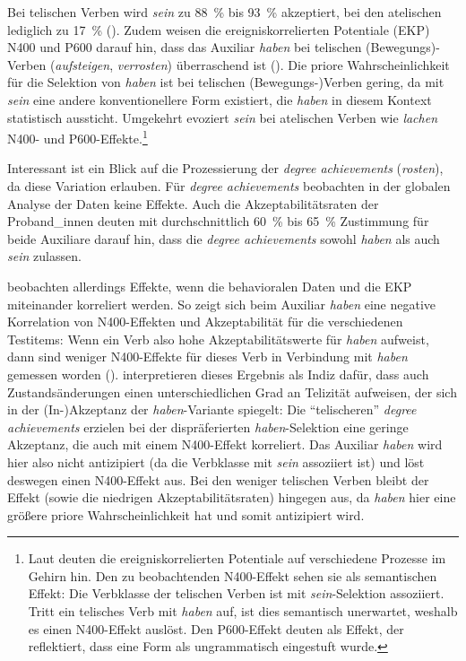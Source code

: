 Bei telischen Verben wird \textit{sein} zu 88~\% bis 93~\% akzeptiert, bei den atelischen lediglich zu 17~\% (\cite[1250]{Roehm.2013}). Zudem weisen die ereigniskorrelierten Potentiale (EKP) N400 und P600 darauf hin, dass das Auxiliar \textit{haben} bei telischen (Bewegungs)-Verben (\textit{aufsteigen}, \textit{verrosten}) überraschend ist (\cite[1251--1255]{Roehm.2013}). Die priore Wahrscheinlichkeit für die Selektion von \textit{haben} ist bei telischen (Bewegungs-)Verben gering, da mit \textit{sein} eine andere konventionellere Form existiert, die \textit{haben} in diesem Kontext statistisch aussticht. Umgekehrt evoziert \textit{sein} bei atelischen Verben wie \textit{lachen} N400- und P600-Effekte.\footnote{Laut \textcite[1266--1267]{Roehm.2013} deuten die ereigniskorrelierten Potentiale auf verschiedene Prozesse im Gehirn hin. Den zu beobachtenden N400-Effekt sehen sie als semantischen Effekt: Die Verbklasse der telischen Verben ist mit \textit{sein}-Selektion assoziiert. Tritt ein telisches Verb mit \textit{haben} auf, ist dies semantisch unerwartet, weshalb es einen N400-Effekt auslöst. Den P600-Effekt deuten \textcite[1266--1267]{Roehm.2013} als Effekt, der reflektiert, dass eine Form als ungrammatisch eingestuft wurde.} 

 

Interessant ist ein Blick auf die Prozessierung der \textit{degree achievements} (\textit{rosten}), da diese Variation erlauben. Für \textit{degree achievements}  beobachten \textcite[1257--1258]{Roehm.2013} in der globalen Analyse der Daten keine Effekte. Auch die Akzeptabilitätsraten der Proband\_innen deuten mit durchschnittlich 60~\% bis 65~\% Zustimmung für beide Auxiliare darauf hin, dass die \textit{degree achievements} sowohl \textit{haben} als auch \textit{sein} zulassen. 

 
\textcite[1257--1264]{Roehm.2013} beobachten allerdings Effekte, wenn die behavioralen Daten und die EKP miteinander korreliert werden. So zeigt sich beim Auxiliar \textit{haben} eine negative Korrelation von N400-Effekten und Akzeptabilität für die verschiedenen Testitems: Wenn ein Verb also hohe Akzeptabilitätswerte für \textit{haben} aufweist, dann sind weniger N400-Effekte für dieses Verb in Verbindung mit \textit{haben} gemessen worden (\cite[1268]{Roehm.2013}). \textcite[1268]{Roehm.2013} interpretieren dieses Ergebnis als Indiz dafür, dass auch Zustandsänderungen einen unterschiedlichen Grad an Telizität aufweisen, der sich in der (In-)Akzeptanz der \textit{haben}-Variante spiegelt: Die "`telischeren"' \textit{degree achievements} erzielen bei der dispräferierten \textit{haben}-Selektion eine geringe Akzeptanz, die auch mit einem N400-Effekt korreliert. Das Auxiliar \textit{haben} wird hier also nicht antizipiert (da die Verbklasse mit \textit{sein} assoziiert ist) und löst deswegen einen N400-Effekt aus. Bei den weniger telischen Verben bleibt der Effekt (sowie die niedrigen Akzeptabilitätsraten) hingegen aus, da \textit{haben} hier eine größere priore Wahrscheinlichkeit hat und somit antizipiert wird. 

